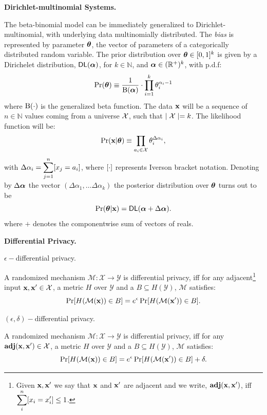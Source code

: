 \documentclass{article}
\begin{document}
\noindent \textbf{Dirichlet-multinomial Systems.}

The beta-binomial model can be immediately generalized to Dirichlet-multinomial, with underlying data multinomially distributed. The \emph{bias} is represented by parameter $\boldsymbol{\theta}$, the vector of parameters of a categorically distributed random variable. The prior distribution over $\boldsymbol{\theta}\in [0,1]^{k}$
is given by a Dirichelet distribution, $\mathsf{DL}(\boldsymbol{\alpha})$, for $k\in\mathbb{N}$,
and $\boldsymbol{\alpha}\in(\mathbb{R}^{+})^{k}$, with p.d.f:
\[
  \Pr(\boldsymbol{\theta})\equiv\frac{1}{\boldsymbol{\textup{B}}(\boldsymbol{\alpha})}\cdot \displaystyle\prod_{i=1}^{k}{\theta_i^{\alpha_i-1}}
\]
where $\boldsymbol{\textup{B}}(\cdot)$ is the generalized beta function.
The data $\textbf{x}$ will be a sequence of $n\in\mathbb{N}$ values
coming from a universe $\mathcal{X}$, such that $\mid\mathcal{X} \mid=k$.
The likelihood function will be:
\[
  \Pr(\textbf{x}|\boldsymbol{\theta})\equiv \displaystyle\prod_{a_i\in\mathcal{X}}\theta_{i}^{\Delta \alpha_i},
\]
with $\Delta \alpha_i=\displaystyle\sum_{j=1}^{n}[x_j=a_i]$, where $[\cdot]$ represents Iverson bracket notation.
Denoting by $\Delta\boldsymbol{\alpha}$ the vector $(\Delta\alpha_1,\dots \Delta\alpha_k)$ the posterior distribution over $\boldsymbol{\theta}$ turns out to be
\[
  \Pr(\boldsymbol{\theta}|\textbf{x})=\mathsf{DL}(\boldsymbol{\alpha}+\Delta \boldsymbol{\alpha}). 
\]
where $+$ denotes the componentwise sum of vectors of reals. 

\noindent \textbf{Differential Privacy.} 
\begin{definition}
\label{def_epsilon_dp}
$\epsilon-$differential privacy.

A randomized mechanism $\mathcal{M}: \mathcal{X} \rightarrow \mathcal{Y}$ is differential privacy, iff for any adjacent\footnote{Given $\textbf{x}, \textbf{x}'$  we say that $\textbf{x}$ and $\textbf{x}'$ are adjacent and we write, $\textbf{adj}(\textbf{x},\textbf{x}')$, iff\\
$\displaystyle \sum_{i}^{n}[x_i = x'_i ]\leq 1$. } input $\textbf{x}, \textbf{x}' \in \mathcal{X}$, a metric $H$ over $\mathcal{Y}$ and a $B \subseteq H(\mathcal{Y})$, $\mathcal{M}$ satisfies:
\begin{equation*}
\Pr[H(\mathcal{M}(\textbf{x})) \in B] = e^\epsilon \Pr[H(\mathcal{M}(\textbf{x}')) \in B].
\end{equation*}

\end{definition}

\begin{definition}
\label{def_epsilon_delta_dp}
$(\epsilon,\delta)-$differential privacy.

A randomized mechanism $\mathcal{M}: \mathcal{X} \rightarrow \mathcal{Y}$ is differential privacy, iff for any $\textbf{adj}(\textbf{x},\textbf{x}') \in \mathcal{X}$, a metric $H$ over $\mathcal{Y}$ and a $B \subseteq H(\mathcal{Y})$, $\mathcal{M}$ satisfies:
\begin{equation*}
\Pr[H(\mathcal{M}(\textbf{x})) \in B] = e^\epsilon \Pr[H(\mathcal{M}(\textbf{x}')) \in B] + \delta.
\end{equation*} 
\end{definition}
\end{document}

